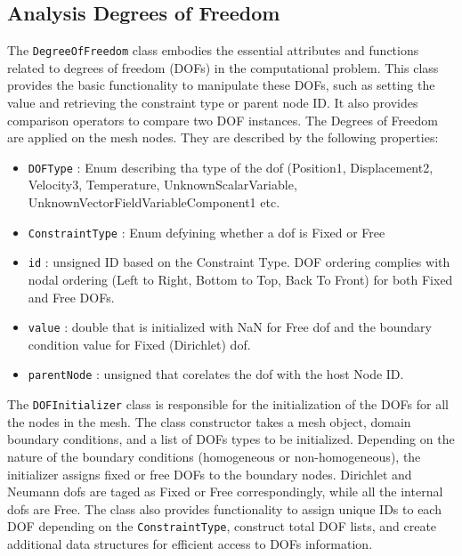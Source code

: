 \documentclass{article}
\begin{document}
	\subsection{Analysis Degrees of Freedom}
	The \texttt{DegreeOfFreedom} class embodies the essential attributes and functions related to degrees of freedom (DOFs) in the computational problem. This class provides the basic functionality to manipulate these DOFs, such as setting the value and retrieving the constraint type or parent node ID. It also provides comparison operators to compare two DOF instances.
	The Degrees of Freedom are applied on the mesh nodes. They are described by the following properties:
	\begin{itemize}
		
		\item \texttt{DOFType} : Enum describing tha type of the dof (Position1, Displacement2, Velocity3, Temperature, UnknownScalarVariable, UnknownVectorFieldVariableComponent1 etc.
		
		\item \texttt{ConstraintType} : Enum defyining whether a dof is Fixed or Free
		
		\item \texttt{id} : unsigned ID based on the Constraint Type. DOF ordering complies with nodal ordering (Left to Right, Bottom to Top, Back To Front) for both Fixed and Free DOFs.
		
		\item \texttt{value} : double that is initialized with NaN for Free dof and the boundary condition value for Fixed (Dirichlet) dof.
		
		\item \texttt{parentNode} :  unsigned that corelates the dof with the host Node ID.
	\end{itemize}
	
	The \texttt{DOFInitializer} class is responsible for the initialization of the DOFs for all the nodes in the mesh. The class constructor takes a mesh object, domain boundary conditions, and a list of DOFs types to be initialized. Depending on the nature of the boundary conditions (homogeneous or non-homogeneous), the initializer assigns fixed or free DOFs to the boundary nodes. Dirichlet and Neumann dofs are taged as Fixed or Free correspondingly, while all the internal dofs are Free. The class also provides functionality to assign unique IDs to each DOF depending on the \texttt{ConstraintType}, construct total DOF lists, and create additional data structures for efficient access to DOFs information.
	
\end{document}
